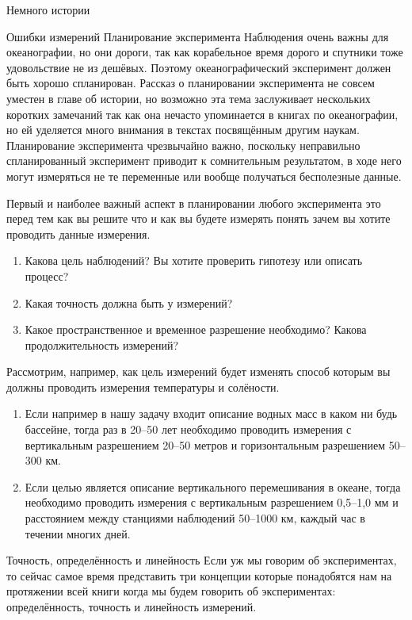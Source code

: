 \begin{chapter}{Немного истории}
\begin{section}{Ошибки измерений}
Планирование эксперимента Наблюдения очень важны для океанографии, но
они дороги, так как корабельное время дорого и спутники тоже
удовольствие не из дешёвых. Поэтому океанографический эксперимент
должен быть хорошо спланирован. Рассказ о планировании эксперимента не
совсем уместен в главе об истории, но возможно эта тема заслуживает
нескольких коротких замечаний так как она нечасто упоминается в книгах
по океанографии, но ей уделяется много внимания в текстах посвящённым
другим наукам. Планирование эксперимента чрезвычайно важно, поскольку
неправильно спланированный эксперимент приводит к сомнительным
результатом, в ходе него могут измеряться не те переменные или вообще
получаться бесполезные данные.

Первый и наиболее важный аспект в планировании любого эксперимента это
перед тем как вы решите что и как вы будете измерять понять зачем вы
хотите проводить данные измерения.

\begin{enumerate}
\item 
Какова цель наблюдений? Вы хотите проверить гипотезу или описать
процесс?

\item 
Какая точность должна быть у измерений?

\item
Какое пространственное и временное разрешение необходимо? Какова
продолжительность измерений?
\end{enumerate}

Рассмотрим, например, как цель измерений будет изменять способ которым
вы должны проводить измерения температуры и солёности.
\begin{enumerate}
\item
Если например в нашу задачу входит описание водных масс в каком ни
будь бассейне, тогда раз в 20--50 лет необходимо проводить измерения
с вертикальным разрешением 20--50 метров и горизонтальным
разрешением 50--300 км.

\item
Если целью является описание вертикального перемешивания в океане,
тогда необходимо проводить измерения с вертикальным разрешением
0,5--1,0 мм и расстоянием между станциями наблюдений 50--1000 км,
каждый час в течении многих дней.
\end{enumerate}

Точность, определённость и линейность Если уж мы говорим об
экспериментах, то сейчас самое время представить три концепции которые
понадобятся нам на протяжении всей книги когда мы будем говорить об
экспериментах: определённость, точность и линейность измерений.


\end{section}
\end{chapter}
